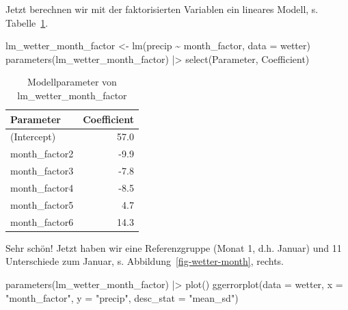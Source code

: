 \documentclass[
  letterpaper,
  twoside,
  open=any]{scrbook}
\newenvironment{Shaded}{\begin{snugshade}}{\end{snugshade}}
\newcommand{\AttributeTok}[1]{\textcolor[rgb]{0.40,0.45,0.13}{#1}}
\newcommand{\FunctionTok}[1]{\textcolor[rgb]{0.28,0.35,0.67}{#1}}
\newcommand{\NormalTok}[1]{\textcolor[rgb]{0.00,0.23,0.31}{#1}}
\newcommand{\OtherTok}[1]{\textcolor[rgb]{0.00,0.23,0.31}{#1}}
\newcommand{\SpecialCharTok}[1]{\textcolor[rgb]{0.37,0.37,0.37}{#1}}
\newcommand{\StringTok}[1]{\textcolor[rgb]{0.13,0.47,0.30}{#1}}
\theoremstyle{definition}
\theoremstyle{definition}
\theoremstyle{definition}
\theoremstyle{remark}
\begin{document}
Jetzt berechnen wir mit der faktorisierten Variablen ein lineares
Modell, s. Tabelle~\ref{tbl-lm_wetter_month_factor}.

\begin{Shaded}
\begin{Highlighting}[]
\NormalTok{lm\_wetter\_month\_factor }\OtherTok{\textless{}{-}} \FunctionTok{lm}\NormalTok{(precip }\SpecialCharTok{\textasciitilde{}}\NormalTok{ month\_factor, }\AttributeTok{data =}\NormalTok{ wetter)}
\FunctionTok{parameters}\NormalTok{(lm\_wetter\_month\_factor) }\SpecialCharTok{|\textgreater{}} 
  \FunctionTok{select}\NormalTok{(Parameter, Coefficient)}
\end{Highlighting}
\end{Shaded}

\begin{longtable}[]{@{}lr@{}}

\caption{\label{tbl-lm_wetter_month_factor}Modellparameter von
lm\_wetter\_month\_factor}

\tabularnewline

\toprule\noalign{}
Parameter & Coefficient \\
\midrule\noalign{}
\endhead
\bottomrule\noalign{}
\endlastfoot
(Intercept) & 57.0 \\
month\_factor2 & -9.9 \\
month\_factor3 & -7.8 \\
month\_factor4 & -8.5 \\
month\_factor5 & 4.7 \\
month\_factor6 & 14.3 \\

\end{longtable}

Sehr schön! Jetzt haben wir eine Referenzgruppe (Monat 1, d.h. Januar)
und 11 Unterschiede zum Januar, s. Abbildung~\ref{fig-wetter-month},
rechts.

\begin{Shaded}
\begin{Highlighting}[]
\FunctionTok{parameters}\NormalTok{(lm\_wetter\_month\_factor) }\SpecialCharTok{|\textgreater{}} \FunctionTok{plot}\NormalTok{()}
\FunctionTok{ggerrorplot}\NormalTok{(}\AttributeTok{data =}\NormalTok{ wetter, }\AttributeTok{x =} \StringTok{"month\_factor"}\NormalTok{, }\AttributeTok{y =} \StringTok{"precip"}\NormalTok{,}
            \AttributeTok{desc\_stat =} \StringTok{"mean\_sd"}\NormalTok{)}
\end{Highlighting}
\end{Shaded}
\end{document}
